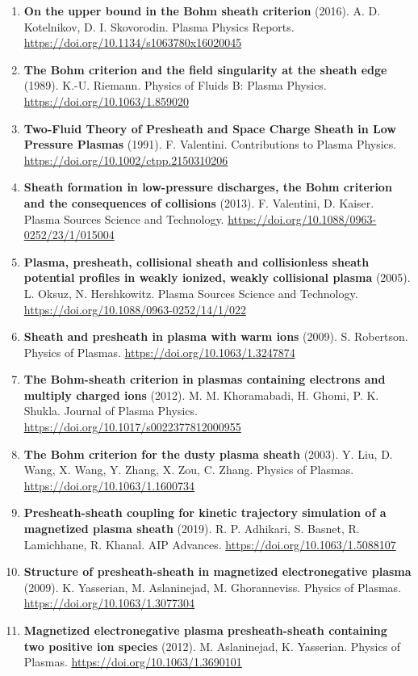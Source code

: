 \documentclass[11pt,a4paper]{article}
\begin{document}
\begin{enumerate}[leftmargin=1.4em]
\item \textbf{On the upper bound in the Bohm sheath criterion} (2016). A. D. Kotelnikov, D. I. Skovorodin. Plasma Physics Reports. \url{https://doi.org/10.1134/s1063780x16020045}
\item \textbf{The Bohm criterion and the field singularity at the sheath edge} (1989). K.-U. Riemann. Physics of Fluids B: Plasma Physics. \url{https://doi.org/10.1063/1.859020}
\item \textbf{Two-Fluid Theory of Presheath and Space Charge Sheath in Low Pressure Plasmas} (1991). F. Valentini. Contributions to Plasma Physics. \url{https://doi.org/10.1002/ctpp.2150310206}
\item \textbf{Sheath formation in low-pressure discharges, the Bohm criterion and the consequences of collisions} (2013). F. Valentini, D. Kaiser. Plasma Sources Science and Technology. \url{https://doi.org/10.1088/0963-0252/23/1/015004}
\item \textbf{Plasma, presheath, collisional sheath and collisionless sheath potential profiles in weakly ionized, weakly collisional plasma} (2005). L. Oksuz, N. Hershkowitz. Plasma Sources Science and Technology. \url{https://doi.org/10.1088/0963-0252/14/1/022}
\item \textbf{Sheath and presheath in plasma with warm ions} (2009). S. Robertson. Physics of Plasmas. \url{https://doi.org/10.1063/1.3247874}
\item \textbf{The Bohm-sheath criterion in plasmas containing electrons and multiply charged ions} (2012). M. M. Khoramabadi, H. Ghomi, P. K. Shukla. Journal of Plasma Physics. \url{https://doi.org/10.1017/s0022377812000955}
\item \textbf{The Bohm criterion for the dusty plasma sheath} (2003). Y. Liu, D. Wang, X. Wang, Y. Zhang, X. Zou, C. Zhang. Physics of Plasmas. \url{https://doi.org/10.1063/1.1600734}
\item \textbf{Presheath-sheath coupling for kinetic trajectory simulation of a magnetized plasma sheath} (2019). R. P. Adhikari, S. Basnet, R. Lamichhane, R. Khanal. AIP Advances. \url{https://doi.org/10.1063/1.5088107}
\item \textbf{Structure of presheath-sheath in magnetized electronegative plasma} (2009). K. Yasserian, M. Aslaninejad, M. Ghoranneviss. Physics of Plasmas. \url{https://doi.org/10.1063/1.3077304}
\item \textbf{Magnetized electronegative plasma presheath-sheath containing two positive ion species} (2012). M. Aslaninejad, K. Yasserian. Physics of Plasmas. \url{https://doi.org/10.1063/1.3690101}

\end{enumerate}
\end{document}
